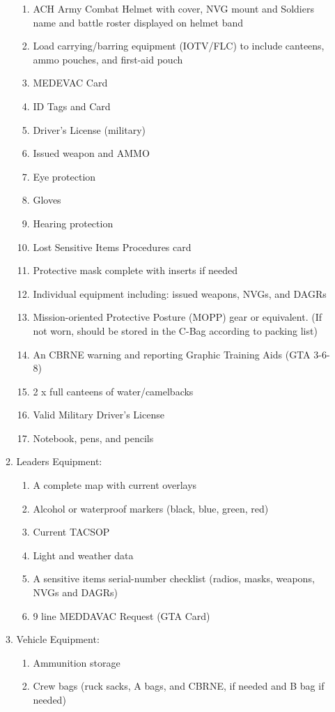 \documentclass{article}
\begin{document}
\begin{enumerate}
\begin{enumerate}
\begin{enumerate}
\item ACH Army Combat Helmet with cover, NVG mount and Soldiers name and battle roster displayed on helmet band
\item Load carrying/barring equipment (IOTV/FLC) to include canteens, ammo pouches, and first-aid pouch
\item MEDEVAC Card
\item	ID Tags and Card
\item	Driver’s License (military)
\item	Issued weapon and AMMO
\item Eye protection
\item	Gloves
\item	Hearing protection
\item	Lost Sensitive Items Procedures card
\item	Protective mask complete with inserts if needed 
\item	Individual equipment including: issued weapons, NVGs, and DAGRs
\item	Mission-oriented Protective Posture (MOPP) gear or equivalent. (If not worn, should be stored in the C-Bag according to packing list)
\item	An CBRNE warning and reporting Graphic Training Aids (GTA 3-6-8)
\item	2 x full canteens of water/camelbacks
\item	Valid Military Driver’s License
\item	Notebook, pens, and pencils
\end{enumerate}
\item Leaders Equipment:
\begin{enumerate}
    \item	A complete map with current overlays
    \item	Alcohol or waterproof markers (black, blue, green, red)
    \item	Current TACSOP
    \item	Light and weather data
    \item	A sensitive items serial-number checklist (radios, masks, weapons, NVGs and DAGRs)
    \item	9 line MEDDAVAC Request (GTA Card)
\end{enumerate}
\item Vehicle Equipment:
\begin{enumerate}
\item	Ammunition storage
\item	Crew bags (ruck sacks, A bags, and CBRNE, if needed and B bag if needed)

\end{enumerate}
\end{enumerate}
\end{enumerate}
\end{document}

